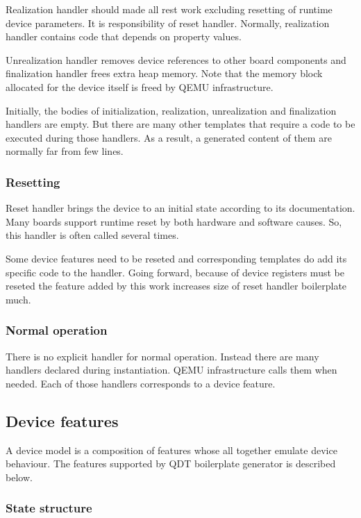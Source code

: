 \documentclass[conference,compsoc,a4paper]{IEEEtran}
\begin{document}
Realization handler should made all rest work excluding resetting of
runtime device parameters.
It is responsibility of reset handler.
Normally, realization handler contains code that depends on property
values.

Unrealization handler removes device references to other board components
and finalization handler frees extra heap memory.
Note that the memory block allocated for the device itself is freed by
QEMU infrastructure.

Initially, the bodies of initialization, realization, unrealization and
finalization handlers are empty.
But there are many other templates that require a code to be executed
during those handlers.
As a result, a generated content of them are normally far from few lines.

\subsubsection{Resetting}

Reset handler brings the device to an initial state according to
its documentation.
Many boards support runtime reset by both hardware and software causes.
So, this handler is often called several times.

Some device features need to be reseted and corresponding templates do
add its specific code to the handler.
Going forward, because of device registers must be reseted the feature
added by this work increases size of reset handler boilerplate much.

\subsubsection{Normal operation}

There is no explicit handler for normal operation.
Instead there are many handlers declared during instantiation.
QEMU infrastructure calls them when needed.
Each of those handlers corresponds to a device feature.

\subsection{Device features}

A device model is a composition of features whose all together emulate
device behaviour.
The features supported by QDT boilerplate generator is described below.

\subsubsection{State structure}
\end{document}
